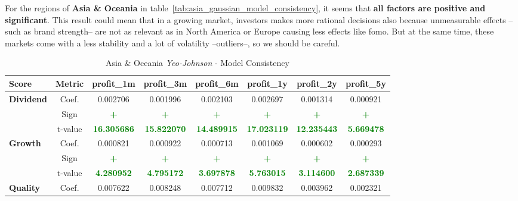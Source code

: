 \documentclass[11pt,english,a4paper,hidelinks]{book}
\begin{document}
\noindent For the regions of \textbf{Asia \& Oceania} in table~\ref{tab:asia_gaussian_model_consistency}, it seems that \textbf{all factors are positive and significant}. This result could mean that in a growing market, investors makes more rational decisions also because unmeasurable effects --such as brand strength-- are not as relevant as in North America or Europe causing less effects like \acrshort{fomo}. But at the same time, these markets come with a less stability and a lot of volatility --outliers--, so we should be careful.

\begin{table}[H]
    \centering
    \caption{Asia \& Oceania \textit{Yeo-Johnson} - Model Consistency}
    \begin{tabular}{lccccccc}
        \toprule
        \textbf{Score} & \textbf{Metric} & \textbf{profit\_1m} & \textbf{profit\_3m} & \textbf{profit\_6m} & \textbf{profit\_1y} & \textbf{profit\_2y} & \textbf{profit\_5y} \\
        \midrule
        \multirow{3}{*}{\textbf{Dividend}} 
            & Coef. & 0.002706 & 0.001996 & 0.002103 & 0.002697 & 0.001314 & 0.000921 \\
            & Sign & \textbf{\textcolor{green}{+}} & \textbf{\textcolor{green}{+}} & \textbf{\textcolor{green}{+}} & \textbf{\textcolor{green}{+}} & \textbf{\textcolor{green}{+}} & \textbf{\textcolor{green}{+}} \\
            & t-value & \textbf{\textcolor{green}{16.305686}} & \textbf{\textcolor{green}{15.822070}} & \textbf{\textcolor{green}{14.489915}} & \textbf{\textcolor{green}{17.023119}} & \textbf{\textcolor{green}{12.235443}} & \textbf{\textcolor{green}{5.669478}} \\
        \midrule
        \multirow{3}{*}{\textbf{Growth}} 
            & Coef. & 0.000821 & 0.000922 & 0.000713 & 0.001069 & 0.000602 & 0.000293 \\
            & Sign & \textbf{\textcolor{green}{+}} & \textbf{\textcolor{green}{+}} & \textbf{\textcolor{green}{+}} & \textbf{\textcolor{green}{+}} & \textbf{\textcolor{green}{+}} & \textbf{\textcolor{green}{+}} \\
            & t-value & \textbf{\textcolor{green}{4.280952}} & \textbf{\textcolor{green}{4.795172}} & \textbf{\textcolor{green}{3.697878}} & \textbf{\textcolor{green}{5.763015}} & \textbf{\textcolor{green}{3.114600}} & \textbf{\textcolor{green}{2.687339}} \\
        \midrule
        \multirow{3}{*}{\textbf{Quality}} 
            & Coef. & 0.007622 & 0.008248 & 0.007712 & 0.009832 & 0.003962 & 0.002321 \\

\end{tabular}
\end{table}
\end{document}
